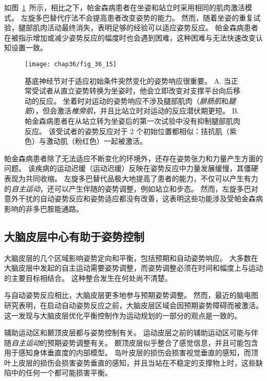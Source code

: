 如图~\ref{fig:36_15}~所示，相比之下，帕金森病患者在坐姿和站立时采用相同的肌肉激活模式。
左旋多巴替代疗法不会提高患者改变姿势的能力。
然而，随着坐姿的重复试验，腿部肌肉活动最终消失，表明足够的经验可以适应姿势反应。
帕金森病患者在被指示增加或减少姿势反应的幅度时也会遇到困难，这种困难与无法快速改变认知设置一致。


\begin{figure}[htbp]
	\centering
	\texttt{[image: chap36/fig\_36\_15]}
	\caption{基底神经节对于适应初始条件突然变化的姿势响应很重要\cite{horak1992postural}。
		A. 当正常受试者从直立姿势转换为坐姿时，他会立即改变对支撑平台向后移动的反应。
		坐着时对运动的姿势响应不涉及腿部肌肉（\textit{腓肠肌}和\textit{腿筋}），但会激活\textit{椎旁肌}，并且比站立时对运动的反应潜伏期更短。
		B. 帕金森病患者在从站立转为坐姿后的第一次试验中没有抑制腿部肌肉反应。
		该受试者的姿势反应对于 2 个初始位置都相似：拮抗肌（紫色）与激动肌（粉红色）一起被激活。}
	\label{fig:36_15}
\end{figure}


帕金森病患者除了无法适应不断变化的环境外，还存在姿势张力和力量产生方面的问题。
该疾病的运动迟缓（运动迟缓）反映在姿势反应中力量发展缓慢，其僵硬表现为共同收缩。
左旋多巴替代品极大地提高了患者的能力，不仅可以产生有力的\textit{自主运动}，还可以产生伴随的姿势调整，例如站立和步态。
然而，左旋多巴对意外干扰的自动姿势反应和姿势适应都没有改善，这表明这些功能涉及受帕金森病影响的非多巴胺能通路。



\subsection{大脑皮层中心有助于姿势控制}

大脑皮层的几个区域影响姿势定向和平衡，包括预期和自动姿势响应。
大多数在大脑皮层中发起的自主运动需要姿势调整，而姿势调整必须在时间和幅度上与运动的主要目标相结合。
这种整合发生在何处尚不清楚。


与自动姿势反应相比，大脑皮层更多地参与预期姿势调整。
然而，最近的脑电图研究表明，在启动自动姿势反应之前，大脑皮层区域会因预期姿势障碍而被激活。
这一发现与大脑皮层优化平衡控制作为运动规划的一部分的观点是一致的。


辅助运动区和颞顶皮层都与姿势控制有关。
运动皮层之前的辅助运动区可能与伴随\textit{自主运动}的预期姿势调整有关。
颞顶皮层似乎整合了感觉信息，并且可能包含用于感知身体垂直度的内部模型。
岛叶皮层的损伤会损害视觉垂直的感知，而顶叶上皮层的损伤会损害姿势垂直的感知，并且当站在不稳定的支撑物上时，这些缺陷中的任何一个都可能损害平衡。


